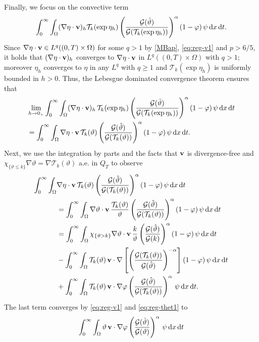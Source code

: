 \documentclass[11pt, a4paper, reqno]{amsart}
\numberwithin{equation}{section}
\newcommand{\thetah}{\hat\thet}
\newcommand{\vc}[1]{{\bf #1}}
\newcommand{\vv}{\vc{v}}
\newcommand{\thet}{\vartheta}
\newcommand{\dt}{\,{\rm d} t }
\newcommand{\dx}{\,{\rm d} {x}}
\newcommand{\G}{\mathcal{G}}
\newcommand{\al}{\alpha}
\newcommand{\QT}{Q_T}
\newcommand{\intnO}[1]{\int_0^{\infty}\intO{ #1 }\dt}
\newcommand{\intO}[1]{\int_{\Omega} #1 \dx}
\begin{document}
Finally, we focus on the convective term
$$
\intnO{(\nabla\eta\cdot\vv)_h  \mathcal{T}_k(\exp{\eta_h})\left(\frac{\G(\thetah)}{\G(\mathcal{T}_k(\exp{\eta_h}))}\right)^{\al}(1-\varphi)\,\psi}.
$$
Since $\nabla\eta\cdot\vv\in L^q((0, T)\times\Omega)$ for some $q>1$ by \eqref{MBap}, \eqref{eq:reg-v1} and $p>6/5$, it holds that $(\nabla\eta\cdot\vv)_h$ converges to $\nabla\eta\cdot\vv$ in $L^q((0, T)\times\Omega)$ with $q>1$; moreover $\eta_h$ converges to $\eta$ in any $L^q$ with $q\geq 1$ and $ \mathcal{T}_k(\exp{\eta_h})$ is uniformly bounded in $h>0$. Thus, the Lebesgue dominated convergence theorem ensures that
\begin{equation*}
\begin{split}
&\lim_{h\to 0_+} \intnO{(\nabla\eta\cdot\vv)_h \, \mathcal{T}_k(\exp{\eta_h})\left(\frac{\G(\thetah)}{\G(\mathcal{T}_k(\exp{\eta_h}))}\right)^{\al}(1-\varphi)\,\psi}\\
&=  \intnO{\nabla\eta\cdot\vv \, \mathcal{T}_k(\thet)\left(\frac{\G(\thetah)}{\G(\mathcal{T}_k(\thet))}\right)^{\al}(1-\varphi)\,\psi}.
\end{split}
\end{equation*}
Next, we use the integration by parts and the facts that $\vv$ is divergence-free and $\chi_{\{\thet\leq k\}}\nabla\thet=\nabla\mathcal{T}_k(\thet)$ a.e. in $\QT$ to observe
\begin{equation}\label{ct}
\begin{split}
 \intnO{&\nabla\eta\cdot\vv \, \mathcal{T}_k(\thet)\left(\frac{\G(\thetah)}{\G(\mathcal{T}_k(\thet))}\right)^{\al}(1-\varphi)\,\psi }\\&=\intnO{\nabla \thet \cdot\vv \, \frac{\mathcal{T}_k(\thet)}{\thet} \left(\frac{\G(\thetah)}{\G(\mathcal{T}_k(\thet))}\right)^{\al} (1-\varphi)\,\psi }\\&=\intnO{\chi_{\{\thet>k\}}\nabla \thet \cdot\vv \,\frac{k }{\thet} \left(\frac{\G(\thetah)}{\G(k)}\right)^{\al} (1-\varphi)\,\psi } \\
& -\intnO{\mathcal{T}_k(\thet)\,\vv  \cdot \nabla\left[\left(\frac{\G(\mathcal{T}_k(\thet))}{\G(\thetah)}\right)^{-\al}\right] (1-\varphi)\,\psi } \\&+ \intnO{\mathcal{T}_k(\thet)\,\vv  \cdot \nabla\varphi\left(\frac{\G(\thetah)}{\G(\mathcal{T}_k(\thet))}\right)^{\al} \,\psi } .
\end{split}
\end{equation}
The last term converges by \eqref{eq:reg-v1} and \eqref{eq:reg-thet1} to
$$  \intnO{\thet\,\vv  \cdot \nabla\varphi\left(\frac{\G(\thetah)}{\G(\thet)}\right)^{\al} \,\psi } $$
\end{document}
